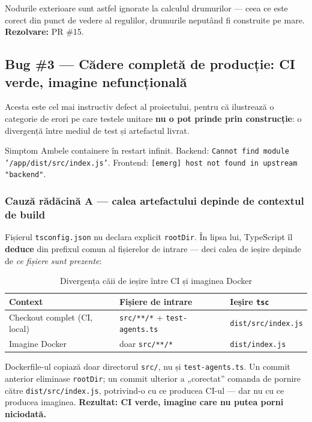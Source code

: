 \documentclass[11pt,a4paper]{article}
\begin{document}
Nodurile exterioare sunt astfel ignorate la calculul drumurilor --- ceea ce este
corect din punct de vedere al regulilor, drumurile neputând fi construite pe mare.
\textbf{Rezolvare:} PR \#15.

\subsection{Bug \#3 --- Cădere completă de producție: CI verde, imagine nefuncțională}
\label{sec:bug3}

Acesta este cel mai instructiv defect al proiectului, pentru că ilustrează o
categorie de erori pe care testele unitare \textbf{nu o pot prinde prin
construcție}: o divergență între mediul de test și artefactul livrat.

\begin{bugbox}{Simptom}
Ambele containere în restart infinit. Backend:
\texttt{Cannot find module '/app/dist/src/index.js'}.
Frontend: \texttt{[emerg] host not found in upstream "backend"}.
\end{bugbox}

\subsubsection{Cauză rădăcină A --- calea artefactului depinde de contextul de build}

Fișierul \texttt{tsconfig.json} nu declara explicit \texttt{rootDir}. În lipsa
lui, TypeScript îl \textbf{deduce} din prefixul comun al fișierelor de intrare ---
deci calea de ieșire depinde de \textit{ce fișiere sunt prezente}:

\begin{table}[H]
\centering
\begin{tabularx}{\textwidth}{@{}l X l@{}}
\toprule
\textbf{Context} & \textbf{Fișiere de intrare} & \textbf{Ieșire \texttt{tsc}} \\
\midrule
Checkout complet (CI, local) & \texttt{src/**/*} + \texttt{test-agents.ts} & \texttt{dist/src/index.js} \\
Imagine Docker & doar \texttt{src/**/*} & \texttt{dist/index.js} \\
\bottomrule
\end{tabularx}
\caption{Divergența căii de ieșire între CI și imaginea Docker}
\end{table}

Dockerfile-ul copiază doar directorul \texttt{src/}, nu și \texttt{test-agents.ts}.
Un commit anterior eliminase \texttt{rootDir}; un commit ulterior a „corectat”
comanda de pornire către \texttt{dist/src/index.js}, potrivind-o cu ce producea
CI-ul --- dar nu cu ce producea imaginea. \textbf{Rezultat: CI verde, imagine care
nu putea porni niciodată.}
\end{document}
